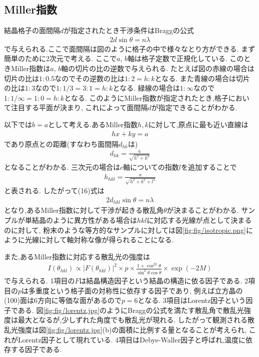\subsection{Miller指数}
結晶格子の面間隔$d$が指定されたとき干渉条件はBraggの公式
\begin{align}
  2d\sin\theta=n\lambda
\end{align}
で与えられる.ここで面間隔は図のように格子の中で様々なとり方ができる.
まず簡単のために2次元で考える.
ここで$a$, $b$軸は格子定数で正規化している.
このときMiller指数は$a$, $b$軸の切片の比の逆数で与えられる.
たとえば図の赤線の場合は切片の比は$1:0.5$なのでその逆数の比は$1:2=h:k$となる.
また青線の場合は切片の比は$1:3$なので$1:1/3=3:1=h:k$となる.
緑線の場合は$1:\infty$なので$1:1/\infty=1:0=h:k$となる.
このようにMiller指数が指定されたとき,格子において注目する平面が決まり,
これによって面間隔$d$が指定できることがわかる.

以下では$b=a$として考える.あるMiller指数$h,k$に対して,原点に最も近い直線は
\begin{align}
  hx+ky=a
\end{align}
であり原点との距離(すなわち面間隔$d_{hk}$は)
\begin{align}
  d_{hk}=\frac{a}{\sqrt{h^2+k^2}}
\end{align}
となることがわかる.
三次元の場合は$c$軸についての指数$l$を追加することで
\begin{align}
  h_{hkl}=\frac{a}{\sqrt{h^2+k^2+l^2}}
\end{align}
と表される.
したがって(16)式は
\begin{align}
  2d_{hkl}\sin\theta=n\lambda
\end{align}
となり,あるMiller指数に対して干渉が起きる散乱角$\theta$が決まることがわかる.
サンプルが単結晶のように異方性がある場合は$hkl$に対応する光線が点として決まるのに対して,
粉末のような等方的なサンプルに対しては図\ref{fig:fig/isotropic.png}にように光線に対して軸対称な像が得られることになる.

また,あるMiller指数に対応する散乱光の強度は
\begin{align}
  I\left(\theta_{hkl}\right)\propto |F\left(\theta_{hkl}\right)|^2\times p\times \frac{1+\cos^22\theta}{\sin^2\theta\cos\theta}\times\exp(-2M)
\end{align}
で与えられる.
1項目の$F$は結晶構造因子という結晶の構造に依る因子である.
2項目の$p$は多重度という格子面の対称性に依存する因子であり,
例えば立方晶の(100)面は6方向に等価な面があるので$p=6$となる.
3項目はLorentz因子という因子である.
図\ref{fig:fig/lorentz.jpg}のようにBraggの公式を満たす散乱角で散乱光強度は最大となるが,少しずれた角度でも散乱光が現れる.
したがって観測される散乱光強度は図\ref{fig:fig/lorentz.jpg}(b)の面積に比例する量となることが考えられ,
これがLorentz因子として現れている.
4項目はDebye-Waller因子と呼ばれ,温度に依存する因子である.
